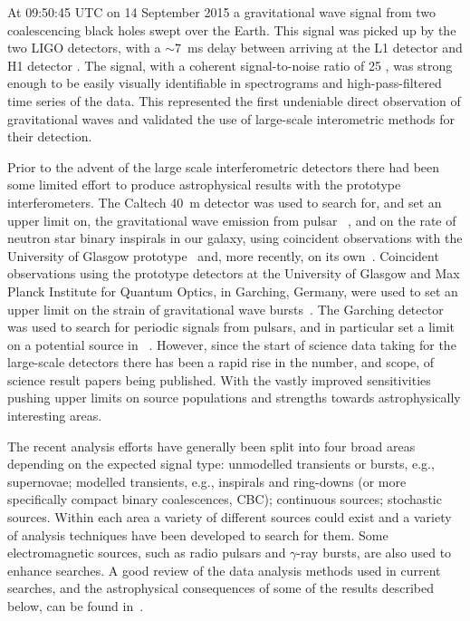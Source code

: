 At 09:50:45 UTC on 14 September 2015 a gravitational wave signal from two coalescencing black holes swept 
over the Earth. This signal was picked up by the two LIGO detectors, with a $\sim 7$~ms delay between 
arriving at the L1 detector and H1 detector \cite{GW150914}. The signal, with a coherent signal-to-noise 
ratio of 25 \cite{2016PhRvL.116x1102A}, was strong enough to be easily visually identifiable in spectrograms 
and high-pass-filtered time series of the data. This represented the first undeniable direct observation of 
gravitational waves and validated the use of large-scale interometric methods for their detection.

Prior to the advent of the large scale interferometric detectors there had been some limited effort to 
produce astrophysical results with the prototype interferometers. The Caltech 40~m detector was used to 
search for, and set an upper limit on, the gravitational wave emission from pulsar
~\cite{Hereld:1984}, and on the rate of neutron star binary inspirals in our 
galaxy, using coincident observations with the University of Glasgow prototype~\cite{Smith:1988} and, more 
recently, on its own~\cite{Allen:1999}. Coincident observations using the prototype detectors at the 
University of Glasgow and Max Planck Institute for Quantum Optics, in Garching, Germany, were used to set
an upper limit on the strain of gravitational wave bursts~\cite{Nicholson:1996}. The Garching detector was 
used to search for periodic signals from pulsars, and in particular set a limit on a potential source in
~\cite{Niebauer:1993}. However, since the start of science data taking for the 
large-scale detectors there has been a rapid rise in the number, and scope, of science result papers being
published. With the vastly improved sensitivities pushing upper limits on source populations and strengths 
towards astrophysically interesting areas.


The recent analysis efforts have generally been split into four broad areas
depending on the expected signal type: unmodelled transients or bursts, e.g.,
supernovae; modelled transients, e.g., inspirals and ring-downs (or more
specifically compact binary coalescences, CBC); continuous sources; stochastic
sources. Within each area a variety of different sources could exist and a
variety of analysis techniques have been developed to search for them. Some
electromagnetic sources, such as radio pulsars and $\gamma$-ray bursts, are also
used to enhance searches. A good review of the data analysis methods used in
current searches, and the astrophysical consequences of some of the results
described below, can be found in~\cite{Sathyaprakash:2009}.

